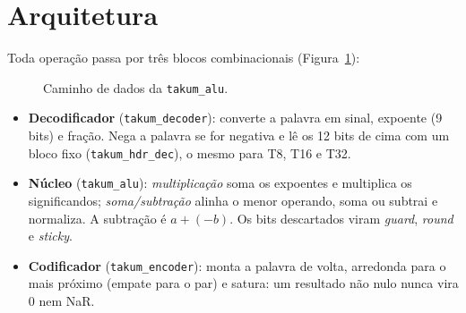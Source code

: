 \documentclass[11pt,a4paper]{article}
\newcommand{\code}[1]{\texttt{#1}}
\begin{document}
\section{Arquitetura}

Toda operação passa por três blocos combinacionais (Figura~\ref{fig:datapath}):

\begin{figure}[H]
\centering
{}
\caption{Caminho de dados da \code{takum\_alu}.}
\label{fig:datapath}
\end{figure}

\begin{itemize}
  \item \textbf{Decodificador} (\code{takum\_decoder}): converte a palavra em sinal, expoente (9 bits)
        e fração. Nega a palavra se for negativa e lê os 12 bits de cima com um bloco fixo
        (\code{takum\_hdr\_dec}), o mesmo para T8, T16 e T32.
  \item \textbf{Núcleo} (\code{takum\_alu}):
        \emph{multiplicação} soma os expoentes e multiplica os significandos;
        \emph{soma/subtração} alinha o menor operando, soma ou subtrai e normaliza.
        A subtração é $a + (-b)$. Os bits descartados viram \emph{guard}, \emph{round} e \emph{sticky}.
  \item \textbf{Codificador} (\code{takum\_encoder}): monta a palavra de volta, arredonda para o
        mais próximo (empate para o par) e satura: um resultado não nulo nunca vira 0 nem NaR.
\end{itemize}
\end{document}
